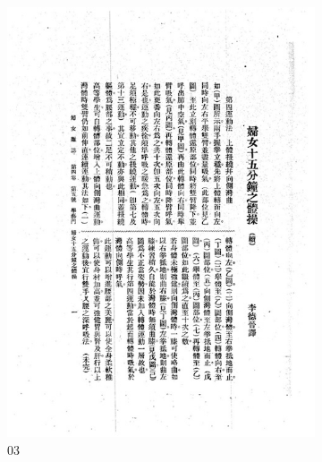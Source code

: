 \documentclass[12pt,twoside]{report}
\begin{document}
\begin{appendices}
\begin{figure}[htbp]
\begin{subfigure}[b]{0.23\linewidth}
        \includegraphics[width=\linewidth]{./figures/testset/03.jpg}
        \caption{03}
        \label{fig:test_03}
    \end{subfigure}
    \hfill
    \begin{subfigure}[b]{0.23\linewidth}

\end{subfigure}
\end{figure}
\end{appendices}
\end{document}
